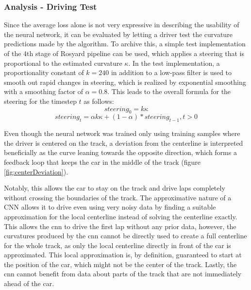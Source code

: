 \subsubsection{Analysis - Driving Test}
Since the average loss alone is not very expressive in describing the usability of the neural network, it can be evaluated by letting a driver test the curvature predictions made by the algorithm. To archive this, a simple test implementation of the 4th stage of Rosyard pipeline can be used, which applies a steering that is proportional to the estimated curvature $\kappa$. In the test implementation, a proportionality constant of $k = 240$ in addition to a low-pass filter is used to smooth out rapid changes in steering, which is realized by exponential smoothing with a smoothing factor of $\alpha = 0.8$. This leads to the overall formula for the steering for the timestep $t$ as follows:\\
$$steering_0= k\kappa$$
$$steering_t= \alpha k\kappa + (1-\alpha)*steering_{t-1}, t > 0$$ 

$ $\\Even though the neural network was trained only using training samples where the driver is centered on the track, a deviation from the centerline is interpreted beneficially as the curve leaning towards the opposite direction, which forms a feedback loop that keeps the car in the middle of the track (figure \ref{fig:centerDeviation}).

Notably, this allows the car to stay on the track and drive laps completely without crossing the boundaries of the track. The approximative nature of a CNN allows it to drive even using very noisy data by finding a suitable approximation for the local centerline instead of solving the centerline exactly. This allows the \ac{cnn} to drive the first lap without any prior data, however, the curvatures produced by the \ac{cnn} cannot be directly used to create a full centerline for the whole track, as only the local centerline directly in front of the car is approximated. This local approximation is, by definition, guaranteed to start at the position of the car, which might not be the center of the track. Lastly, the \ac{cnn} cannot benefit from data about parts of the track that are not immediately ahead of the car.


